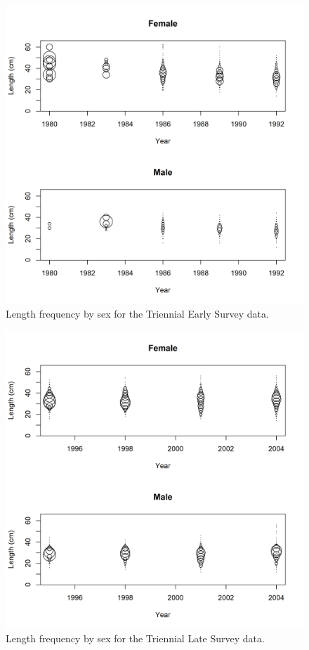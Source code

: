 \documentclass[12pt,]{article}
\begin{document}
\FloatBarrier

\begin{figure}
\centering
\includegraphics{Figures/Triennial Early_Length_Frequency.png}
\caption{Length frequency by sex for the Triennial Early Survey data.
\label{fig:tri_early_len_freq}}
\end{figure}

\FloatBarrier

\begin{figure}
\centering
\includegraphics{Figures/Triennial Late_Length_Frequency.png}
\caption{Length frequency by sex for the Triennial Late Survey data.
\label{fig:tri_late_len_freq}}
\end{figure}
\end{document}
